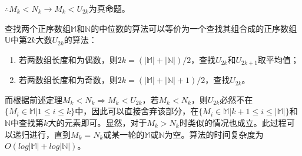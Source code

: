 $\therefore M_k<N_k\rightarrow M_k<U_{2k}$为真命题。

查找两个正序数组$\mathbb M$和$\mathbb N$的中位数的算法可以等价为一个查找其组合成的正序数组$\mathbb U$中第$2k$大数$U_{2k}$的算法：
\begin{enumerate}
    \item 若两数组长度和为偶数，则$2k=(|\mathbb M|+|\mathbb N|)/2$，查找$U_{2k}$和$U_{2k+1}$取平均值；
    \item 若两数组长度和为奇数，则$2k=(|\mathbb M|+|\mathbb N|+1)/2$，查找$U_{2k}$。
\end{enumerate}

而根据前述定理$M_k<N_k\Rightarrow M_k<U_{2k}$，若$M_k<N_k$，则$U_{2k}$必然不在$\{M_i\in\mathbb{M}|1\leq i\leq k\}$中，因此可以直接舍弃该部分，在$\{M_i\in\mathbb{M}|k+1\leq i\leq |\mathbb M|\}$和$\mathbb N$中查找第$k$大的元素即可。显然，对于$M_k>N_k$时类似的情况也成立。此过程可以递归进行，直到$M_k=N_k$或某一轮的$\mathbb{M}$或$\mathbb{N}$为空。算法的时间复杂度为$O(log|\mathbb M|+log|\mathbb N|)$。


